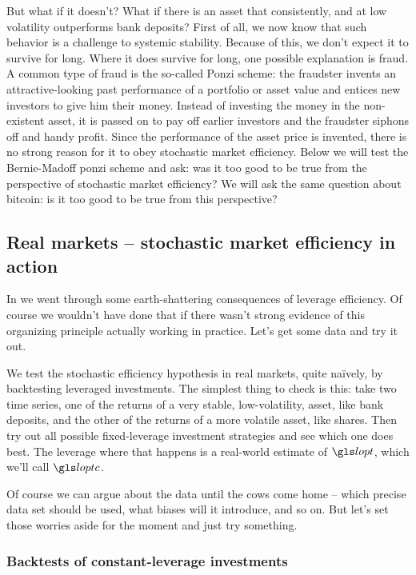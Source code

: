 But what if it doesn't? What if there is an asset that consistently, and at low volatility outperforms bank deposits? 
First of all, we now know that such behavior is a challenge to systemic stability. Because of this, we don't expect it to survive for long. Where it does survive for long, one possible explanation is fraud. A common type of fraud is the so-called Ponzi scheme: the fraudster invents an attractive-looking past performance of a portfolio or asset value and entices new investors to give him their money. Instead of investing the money in the non-existent asset, it is passed on to pay off earlier investors and the fraudster siphons off and handy profit. Since the performance of the asset price is invented, there is no strong reason for it to obey stochastic market efficiency. Below we will test the Bernie-Madoff ponzi scheme and ask: was it too good to be true from the perspective of stochastic market efficiency? We will ask the same question about bitcoin: is it too good to be true from this perspective?

\subsection{Real markets -- stochastic market efficiency in action}
In  we went through some earth-shattering consequences of leverage efficiency. Of course we wouldn't have done that if there wasn't strong evidence of this organizing principle actually working in practice. Let's get some data and try it out. 

We test the stochastic efficiency hypothesis in real markets, quite na\"ively, by backtesting leveraged investments. The simplest thing to check is this: take two time series, one of the returns of a very stable, low-volatility, asset, like bank deposits, and the other of the returns of a more volatile asset, like shares. Then try out all possible fixed-leverage investment strategies and see which one does best. The leverage where that happens is a real-world estimate of $\lopt$, which we'll call $\loptc$.

Of course we can argue about the data until the cows come home -- which precise data set should be used, what biases will it introduce, and so on. But let's set those worries aside for the moment and just try something.


\subsubsection{Backtests of constant-leverage investments}

